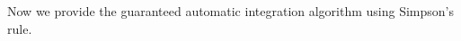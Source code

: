 \documentclass{iitthesis}
\theoremstyle{definition}
\theoremstyle{remark}
\begin{document}
%
%
%
Now we provide the guaranteed automatic integration algorithm using Simpson's rule.
\end{document}
